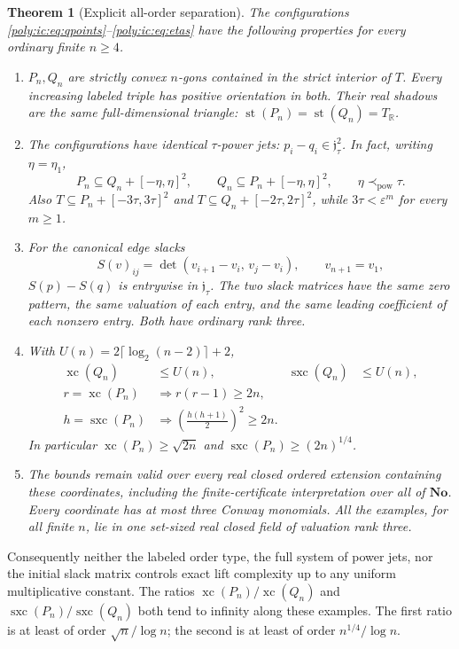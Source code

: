 \documentclass[11pt,a4paper]{article}
\numberwithin{equation}{section}
\newtheorem{theorem}{Theorem}[section]
\theoremstyle{plain}
\newcommand{\No}{\mathbf{No}}
\newcommand{\R}{\mathbb R}
\newcommand{\eps}{\varepsilon}
\newcommand{\st}{\operatorname{st}}
\newcommand{\xc}{\operatorname{xc}}
\newcommand{\JJ}{\mathfrak j}
\newcommand{\sx}{\operatorname{sxc}}
\newcommand{\boxrad}[1]{[-#1,#1]^2}
\newcommand{\powprec}{\mathrel{\prec_{\mathrm{pow}}}}
\begin{document}
\begin{theorem}[Explicit all-order separation]\label{poly:ic:thm:main}
The configurations \eqref{poly:ic:eq:qpoints}--\eqref{poly:ic:eq:etas} have the following
properties for every ordinary finite $n\geq4$.
\begin{enumerate}[label=\textnormal{(\roman*)},leftmargin=*,itemsep=4pt]
\item $P_n,Q_n$ are strictly convex $n$-gons contained in the strict interior
of $T$. Every increasing labeled triple has positive orientation in both.
Their real shadows are the same full-dimensional triangle:
$\st(P_n)=\st(Q_n)=T_\R$.
\item The configurations have identical $\tau$-power jets:
$p_i-q_i\in\JJ_\tau^2$. In fact, writing $\eta=\eta_1$,
\[
 P_n\subseteq Q_n+\boxrad{\eta},\qquad
 Q_n\subseteq P_n+\boxrad{\eta},\qquad \eta\powprec\tau.
\]
Also $T\subseteq P_n+\boxrad{3\tau}$ and
$T\subseteq Q_n+\boxrad{2\tau}$, while $3\tau<\eps^m$ for every $m\geq1$.
\item For the canonical edge slacks
\[
 S(v)_{ij}=\det(v_{i+1}-v_i,\,v_j-v_i),\qquad v_{n+1}=v_1,
\]
$S(p)-S(q)$ is entrywise in $\JJ_\tau$. The two slack matrices have the
same zero pattern, the same valuation of each entry, and the same leading
coefficient of each nonzero entry. Both have ordinary rank three.
\item With $U(n)=2\lceil\log_2(n-2)\rceil+2$,
\begin{align}
 \xc(Q_n)&\leq U(n),& \sx(Q_n)&\leq U(n),\label{poly:ic:eq:easybounds}\\
 r=\xc(P_n)&\Longrightarrow r(r-1)\geq2n,\label{poly:ic:eq:hardlp}\\
 h=\sx(P_n)&\Longrightarrow
       \left(\frac{h(h+1)}2\right)^2\geq2n.
       \label{poly:ic:eq:hardpsd}
\end{align}
In particular $\xc(P_n)\geq\sqrt{2n}$ and
$\sx(P_n)\geq(2n)^{1/4}$.
\item The bounds remain valid over every real closed ordered extension
containing these coordinates, including the finite-certificate
interpretation over all of $\No$. Every coordinate has at most three
Conway monomials. All the examples, for all finite $n$, lie in one
set-sized real closed field of valuation rank three.
\end{enumerate}
\end{theorem}

\begin{claimbox}
Consequently neither the labeled order type, the full system of power jets,
nor the initial slack matrix controls exact lift complexity up to any
uniform multiplicative constant. The ratios
$\xc(P_n)/\xc(Q_n)$ and $\sx(P_n)/\sx(Q_n)$ both tend to infinity along
these examples. The first ratio is at least of order $\sqrt n/\log n$;
the second is at least of order $n^{1/4}/\log n$.
\end{claimbox}
\end{document}
